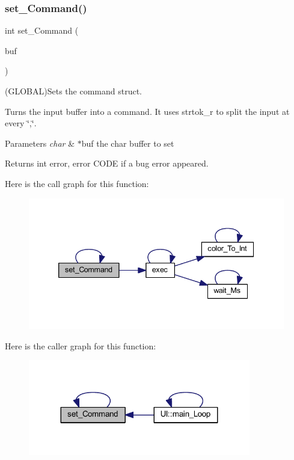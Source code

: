 \subsubsection{\texorpdfstring{set\+\_\+\+Command()}{set\_Command()}}
{\footnotesize\ttfamily int set\+\_\+\+Command (\begin{DoxyParamCaption}\item[{char $\ast$}]{buf }\end{DoxyParamCaption})}



(G\+L\+O\+B\+AL)Sets the command struct. 

Turns the input buffer into a command. It uses strtok\+\_\+r to split the input at every \char`\"{},\char`\"{}.


\begin{DoxyParams}{Parameters}
{\em char} & $\ast$buf the char buffer to set \\
\hline
\end{DoxyParams}
\begin{DoxyReturn}{Returns}
int error, error C\+O\+DE if a bug error appeared. 
\end{DoxyReturn}
Here is the call graph for this function\+:\nopagebreak
\begin{figure}[H]
\begin{center}
\leavevmode
\includegraphics[width=339pt]{namespace_l_l_a487e020844f801061abc930461b1ff2b_cgraph}
\end{center}
\end{figure}
Here is the caller graph for this function\+:\nopagebreak
\begin{figure}[H]
\begin{center}
\leavevmode
\includegraphics[width=275pt]{namespace_l_l_a487e020844f801061abc930461b1ff2b_icgraph}
\end{center}
\end{figure}
\mbox{\label{namespace_l_l_a5e66446caf21dd90191dc07a13ce2378}} 
